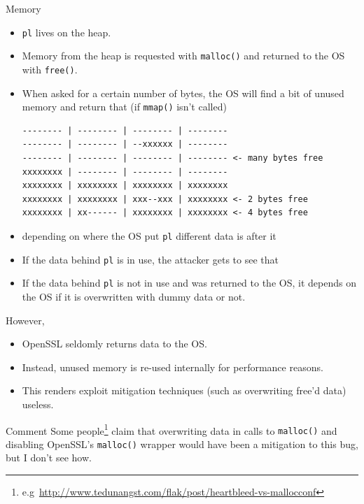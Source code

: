 \documentclass[10pt]{beamer}
\begin{document}
\begin{frame}{Memory}

\begin{itemize}
  \item {\tt pl} lives on the heap.
  \item Memory from the heap is requested with {\tt malloc()} and returned to the OS with {\tt free()}.
  \item When asked for a certain number of bytes, the OS will find a bit of unused memory and return that (if {\tt mmap()} isn't called)
\begin{lstlisting}
-------- | -------- | -------- | -------- 
-------- | -------- | --xxxxxx | -------- 
-------- | -------- | -------- | -------- <- many bytes free
xxxxxxxx | -------- | -------- | -------- 
xxxxxxxx | xxxxxxxx | xxxxxxxx | xxxxxxxx 
xxxxxxxx | xxxxxxxx | xxx--xxx | xxxxxxxx <- 2 bytes free 
xxxxxxxx | xx------ | xxxxxxxx | xxxxxxxx <- 4 bytes free
\end{lstlisting}
 \item depending on where the OS put {\tt pl} different data is after it
\end{itemize}

\framebreak

\begin{itemize}
  \item If the data behind {\tt pl} is in use, the attacker gets to see that
  \item If the data behind {\tt pl} is not in use and was returned to the OS, it depends on the OS if it is overwritten with dummy data or not.
\end{itemize}

However,
\begin{itemize}
  \item OpenSSL seldomly returns data to the OS.
  \item Instead, unused memory is re-used internally for performance reasons.
  \item This renders exploit mitigation techniques (such as overwriting free'd data) useless.
\end{itemize}

\begin{block}{Comment}
Some people\footnote{e.g\ \url{http://www.tedunangst.com/flak/post/heartbleed-vs-mallocconf}} claim that overwriting data in calls to {\tt malloc()} and disabling OpenSSL's {\tt malloc()} wrapper would have been a mitigation to this bug, but I don't see how.
\end{block}


\end{frame}
\end{document}
